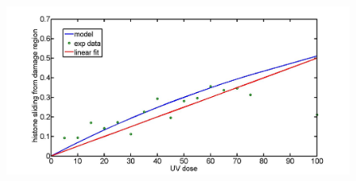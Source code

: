 \documentclass[12pt]{paper}
\begin{document}
\begin{figure}
\centering
\includegraphics[width=0.7\linewidth, height=0.3\textheight]{images/histoneSlideFromDamageRegionComparision}
\caption{}
\label{fig:histoneSlideFromDamageRegionComparision}
\end{figure}
\end{document}
